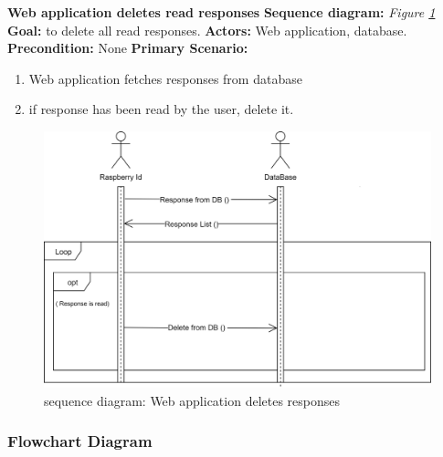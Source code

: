 \documentclass[12pt, oneside, a4paper]{book}
\newcommand\boldcolor[1]{\textcolor{bold}{\textbf{#1}}}
\begin{document}
				\newpage\hspace*{-6mm}\boldcolor{Web application deletes read responses}
				\newline\textbf{Sequence diagram:} \textit{Figure \ref{web_delete_r}}
				\newline\textbf{Goal:} to delete all read responses.
				\newline\textbf{Actors:} Web application, database.
				\newline\textbf{Precondition:} None
				\newline\textbf{Primary Scenario:}	
				\begin{enumerate}[label*=\arabic*.]
					\item Web application fetches responses from database 
					\item if response has been read by the user, delete it.
				\end{enumerate}	
				\begin{figure}[H]
					\includegraphics[width=\linewidth]{img/sequence_web_del_r.png}
					\caption{sequence diagram: Web application deletes responses}
					\label{web_delete_r}
				\end{figure}
				\newpage\subsubsection{Flowchart Diagram}
\end{document}
